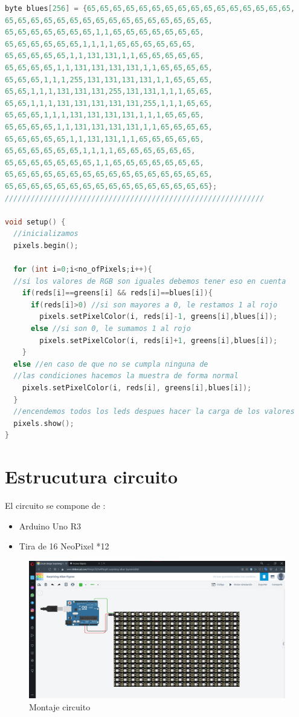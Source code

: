 \documentclass{article}
\begin{document}
\begin{lstlisting}[language=C++, label=codigo_ejemplo]
byte blues[256] = {65,65,65,65,65,65,65,65,65,65,65,65,65,65,65,65,
65,65,65,65,65,65,65,65,65,65,65,65,65,65,65,65,
65,65,65,65,65,65,65,1,1,65,65,65,65,65,65,65,
65,65,65,65,65,65,1,1,1,1,65,65,65,65,65,65,
65,65,65,65,65,1,1,131,131,1,1,65,65,65,65,65,
65,65,65,65,1,1,131,131,131,131,1,1,65,65,65,65,
65,65,65,1,1,1,255,131,131,131,131,1,1,65,65,65,
65,65,1,1,1,131,131,131,255,131,131,1,1,1,65,65,
65,65,1,1,1,131,131,131,131,131,255,1,1,1,65,65,
65,65,65,1,1,1,131,131,131,131,1,1,1,65,65,65,
65,65,65,65,1,1,131,131,131,131,1,1,65,65,65,65,
65,65,65,65,65,1,1,131,131,1,1,65,65,65,65,65,
65,65,65,65,65,65,1,1,1,1,65,65,65,65,65,65,
65,65,65,65,65,65,65,1,1,65,65,65,65,65,65,65,
65,65,65,65,65,65,65,65,65,65,65,65,65,65,65,65,
65,65,65,65,65,65,65,65,65,65,65,65,65,65,65,65};
////////////////////////////////////////////////////////////

void setup() {
  //inicializamos
  pixels.begin();
  
  for (int i=0;i<no_ofPixels;i++){
  //si los valores de RGB son iguales debemos tener eso en cuenta
    if(reds[i]==greens[i] && reds[i]==blues[i]){
      if(reds[i]>0) //si son mayores a 0, le restamos 1 al rojo
        pixels.setPixelColor(i, reds[i]-1, greens[i],blues[i]);
      else //si son 0, le sumamos 1 al rojo
        pixels.setPixelColor(i, reds[i]+1, greens[i],blues[i]);
    }
  else //en caso de que no se cumpla ninguna de 
  //las condiciones hacemos la muestra de forma normal
    pixels.setPixelColor(i, reds[i], greens[i],blues[i]);
  }
  //encendemos todos los leds despues hacer la carga de los valores
  pixels.show();  
}
\end{lstlisting}

\section{Estrucutura circuito}\label{images}
    El circuito se compone de :
    \begin{itemize}
    \item Arduino Uno R3
    \item Tira de 16 NeoPixel *12
    \end{itemize}
    \begin{figure}[h]
    \centering
    \includegraphics[width=1.2\textwidth]{montaje.png}
    \caption{Montaje circuito}
    \label{fig:montaje}
    \end{figure}
    
\end{document}
